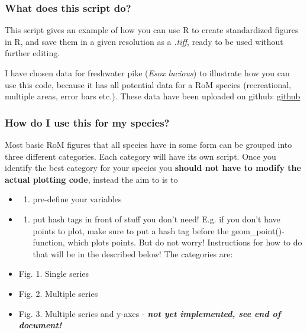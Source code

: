 \documentclass[]{article}
\providecommand{\tightlist}{%
  \setlength{\itemsep}{0pt}\setlength{\parskip}{0pt}}
\begin{document}
\subsubsection{What does this script
do?}\label{what-does-this-script-do}

This script gives an example of how you can use R to create standardized
figures in R, and save them in a given resolution as a \emph{.tiff},
ready to be used without further editing.

I have chosen data for freshwater pike (\emph{Esox lucious}) to
illustrate how you can use this code, because it has all potential data
for a RoM species (recreational, multiple areas, error bars etc.). These
data have been uploaded on github:
\href{https://github.com/maxlindmark/ROM}{github}

\subsubsection{How do I use this for my
species?}\label{how-do-i-use-this-for-my-species}

Most basic RoM figures that all species have in some form can be grouped
into three different categories. Each category will have its own script.
Once you identify the best category for your species you \textbf{should
not have to modify the actual plotting code}, instead the aim to is to

\begin{itemize}
\item
  \begin{enumerate}
  \def\labelenumi{\arabic{enumi}.}
  \tightlist
  \item
    pre-define your variables
  \end{enumerate}
\item
  \begin{enumerate}
  \def\labelenumi{\arabic{enumi}.}
  \setcounter{enumi}{1}
  \tightlist
  \item
    put hash tags in front of stuff you don't need! E.g. if you don't
    have points to plot, make sure to put a hash tag before the
    geom\_point()-function, which plots points. But do not worry!
    Instructions for how to do that will be in the described below! The
    categories are:
  \end{enumerate}
\item
  Fig. 1. Single series
\item
  Fig. 2. Multiple series
\item
  Fig. 3. Multiple series and y-axes - \textbf{\emph{not yet
  implemented, see end of document!}}
\end{itemize}
\end{document}
